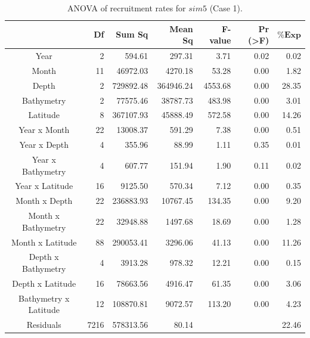 \begin{table}[H]
\centering
\begin{adjustbox}{width=0.9\textwidth}
\small
\begin{tabular}{c|r|r|r|r|r|r}
\hline
                                  &
	\textbf{Df}                   &
	\textbf{Sum Sq}               &
	\textbf{Mean Sq}              &
	\textbf{F-value}    		   &
	\textbf{Pr (\textgreater{F})} &
	$\mathbf{\% Exp}$      \\
\hline
Year                  & 2    & 594.61    & 297.31    & 3.71    & 0.02                & 0.02  \\
Month                 & 11   & 46972.03  & 4270.18   & 53.28   & 0.00                & 1.82  \\
Depth                 & 2    & 729892.48 & 364946.24 & 4553.68 & 0.00                & 28.35 \\
Bathymetry            & 2    & 77575.46  & 38787.73  & 483.98  & 0.00                & 3.01  \\
Latitude              & 8    & 367107.93 & 45888.49  & 572.58  & 0.00                & 14.26 \\
Year x Month          & 22   & 13008.37  & 591.29    & 7.38    & 0.00                & 0.51  \\
Year x Depth          & 4    & 355.96    & 88.99     & 1.11    & 0.35                & 0.01  \\
Year x Bathymetry     & 4    & 607.77    & 151.94    & 1.90    & 0.11                & 0.02  \\
Year x Latitude       & 16   & 9125.50   & 570.34    & 7.12    & 0.00                & 0.35  \\
Month x Depth         & 22   & 236883.93 & 10767.45  & 134.35  & 0.00                & 9.20  \\
Month x Bathymetry    & 22   & 32948.88  & 1497.68   & 18.69   & 0.00                & 1.28  \\
Month x Latitude      & 88   & 290053.41 & 3296.06   & 41.13   & 0.00                & 11.26 \\
Depth x Bathymetry    & 4    & 3913.28   & 978.32    & 12.21   & 0.00                & 0.15  \\
Depth x Latitude      & 16   & 78663.56  & 4916.47   & 61.35   & 0.00                & 3.06  \\
Bathymetry x Latitude & 12   & 108870.81 & 9072.57   & 113.20  & 0.00                & 4.23  \\
Residuals             & 7216 & 578313.56 & 80.14     &         &                     & 22.46 \\
\hline
\end{tabular}
\end{adjustbox}
\caption{ANOVA of recruitment rates for $sim 5$ (Case 1).}
\label{ANOVAsim5}
\end{table}

